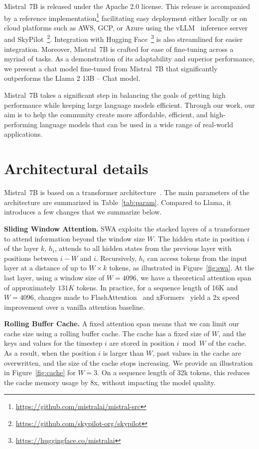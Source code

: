 Mistral~7B is released under the Apache 2.0 license. This release is accompanied by a reference implementation\footnote{\url{https://github.com/mistralai/mistral-src}} facilitating easy deployment either locally or on cloud platforms such as AWS, GCP, or Azure using the vLLM~\cite{kwon2023efficient} inference server and SkyPilot~\footnote{\url{https://github.com/skypilot-org/skypilot}}.
Integration with Hugging Face~\footnote{\url{https://huggingface.co/mistralai}} is also streamlined for easier integration. Moreover, Mistral~7B is crafted for ease of fine-tuning across a myriad of tasks. As a demonstration of its adaptability and superior performance, we present a chat model fine-tuned from Mistral~7B that significantly outperforms the Llama 2 13B -- Chat model.

 Mistral~7B takes a significant step in balancing the goals of getting high performance while keeping large language models efficient. Through our work, our aim is to help the community create more affordable, efficient, and high-performing language models that can be used in a wide range of real-world applications.

\section{Architectural details}

Mistral~7B is based on a transformer architecture~\cite{vaswani2017attention}. The main parameters of the architecture are summarized in Table~\ref{tab:param}. Compared to Llama, it introduces a few changes that we summarize below.

 \textbf{Sliding Window Attention.} SWA exploits the stacked layers of a transformer to attend information beyond the window size $W$. The hidden state in position $i$ of the layer $k$, $h_i$, attends to all hidden states from the previous layer with positions between $i-W$ and $i$. Recursively, $h_i$ can access tokens from the input layer at a distance of up to $W \times k$ tokens, as illustrated in Figure~\ref{fig:swa}.
At the last layer, using a window size of $W=4096$, we have a theoretical attention span of approximately $131K$ tokens. In practice, for a sequence length of 16K and $W=4096$, changes made to FlashAttention~\cite{dao2022flashattention} and xFormers~\cite{xFormers2022} yield a 2x speed improvement over a vanilla attention baseline.

 \textbf{Rolling Buffer Cache.} A fixed attention span means that we can limit our cache size using a rolling buffer cache. The cache has a fixed size of $W$, and the keys and values for the timestep $i$ are stored in position $i \bmod W$ of the cache. As a result, when the position $i$ is larger than $W$, past values in the cache are overwritten, and the size of the cache stops increasing. We provide an illustration in Figure~\ref{fig:cache} for $W=3$. On a sequence length of 32k tokens, this reduces the cache memory usage by 8x, without impacting the model quality.

